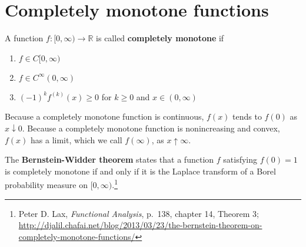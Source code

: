 \documentclass{article}
\theoremstyle{definition}
\begin{document}
\section{Completely monotone functions}
A function $f:[0,\infty) \to \mathbb{R}$ is called \textbf{completely monotone} if
\begin{enumerate}
\item $f \in C[0,\infty)$
\item $f \in C^\infty(0,\infty)$
\item $(-1)^k f^{(k)}(x) \geq 0$ for $k \geq 0$ and $x \in (0,\infty)$
\end{enumerate}
Because a completely monotone function is continuous, $f(x)$ tends to $f(0)$ as  $x \downarrow 0$.
Because a completely monotone function is nonincreasing and convex, 
$f(x)$ has a limit, which we call $f(\infty)$, as $x \uparrow \infty$. 

The \textbf{Bernstein-Widder theorem} states that a function $f$ satisfying
$f(0)=1$ is completely monotone if and only
if it is the Laplace transform of a Borel probability measure on $[0,\infty)$.\footnote{Peter D. Lax, {\em Functional Analysis}, p.~138, chapter 14, Theorem 3;
\url{http://djalil.chafai.net/blog/2013/03/23/the-bernstein-theorem-on-completely-monotone-functions/}}
\end{document}
